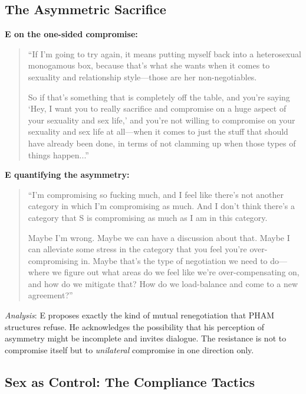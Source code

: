 \documentclass[12pt,openany]{book}
\numberwithin{equation}{chapter}
\begin{document}
\subsection{The Asymmetric Sacrifice}

\textbf{E on the one-sided compromise:}
\begin{quote}
``If I'm going to try again, it means putting myself back into a heterosexual monogamous box, because that's what she wants when it comes to sexuality and relationship style---those are her non-negotiables.

So if that's something that is completely off the table, and you're saying `Hey, I want you to really sacrifice and compromise on a huge aspect of your sexuality and sex life,' and you're not willing to compromise on your sexuality and sex life at all---when it comes to just the stuff that should have already been done, in terms of not clamming up when those types of things happen...''
\end{quote}

\textbf{E quantifying the asymmetry:}
\begin{quote}
``I'm compromising so fucking much, and I feel like there's not another category in which I'm compromising as much. And I don't think there's a category that S is compromising as much as I am in this category.

Maybe I'm wrong. Maybe we can have a discussion about that. Maybe I can alleviate some stress in the category that you feel you're over-compromising in. Maybe that's the type of negotiation we need to do---where we figure out what areas do we feel like we're over-compensating on, and how do we mitigate that? How do we load-balance and come to a new agreement?''
\end{quote}

\textit{Analysis}: E proposes exactly the kind of mutual renegotiation that PHAM structures refuse. He acknowledges the possibility that his perception of asymmetry might be incomplete and invites dialogue. The resistance is not to compromise itself but to \textit{unilateral} compromise in one direction only.

\subsection{Sex as Control: The Compliance Tactics}
\end{document}
